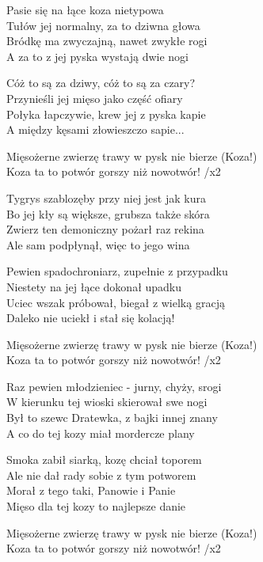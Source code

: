 \begin{text}
    Pasie się na łące koza nietypowa\\
    Tułów jej normalny, za to dziwna głowa\\
    Bródkę ma zwyczajną, nawet zwykłe rogi\\ 
    A za to z jej pyska wystają dwie nogi
	
    Cóż to są za dziwy, cóż to są za czary?\\
    Przynieśli jej mięso jako część ofiary\\
    Połyka łapczywie, krew jej z pyska kapie\\
    A między kęsami złowieszczo sapie...

    \vin Mięsożerne zwierzę trawy w pysk nie bierze (Koza!)\\
    \vin Koza ta to potwór gorszy niż nowotwór! /x2

    Tygrys szablozęby przy niej jest jak kura\\
    Bo jej kły są większe, grubsza także skóra\\
    Zwierz ten demoniczny pożarł raz rekina\\
    Ale sam podpłynął, więc to jego wina

    Pewien spadochroniarz, zupełnie z przypadku\\
    Niestety na jej łące dokonał upadku\\
    Uciec wszak próbował, biegał z wielką gracją\\
    Daleko nie uciekł i stał się kolacją!

    \vin Mięsożerne zwierzę trawy w pysk nie bierze (Koza!)\\
    \vin Koza ta to potwór gorszy niż nowotwór! /x2

    Raz pewien młodzieniec - jurny, chyży, srogi\\
    W kierunku tej wioski skierował swe nogi\\
    Był to szewc Dratewka, z bajki innej znany\\
    A co do tej kozy miał mordercze plany

    Smoka zabił siarką, kozę chciał toporem\\
    Ale nie dał rady sobie z tym potworem\\
    Morał z tego taki, Panowie i Panie\\
    Mięso dla tej kozy to najlepsze danie

    \vin Mięsożerne zwierzę trawy w pysk nie bierze (Koza!)\\
    \vin Koza ta to potwór gorszy niż nowotwór! /x2

\end{text}
